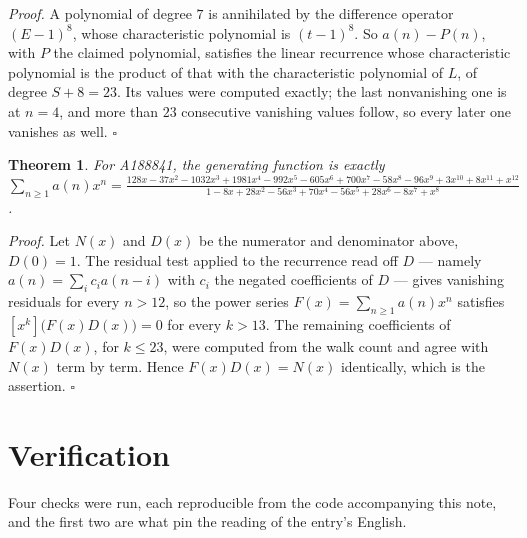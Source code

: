 \documentclass[11pt]{article}
\newtheorem{theorem}{Theorem}
\theoremstyle{definition}
\begin{document}
{\itshape Proof.} A polynomial of degree $7$ is annihilated by the difference operator $(E-1)^{8}$, whose characteristic polynomial is $(t-1)^{8}$. So $a(n) - P(n)$, with $P$ the claimed polynomial, satisfies the linear recurrence whose characteristic polynomial is the product of that with the characteristic polynomial of $L$, of degree $S + 8 = 23$. Its values were computed exactly; the last nonvanishing one is at $n = 4$, and more than $23$ consecutive vanishing values follow, so every later one vanishes as well. $\square$

\begin{theorem} For A188841, the generating function is exactly $\sum_{n\ge 1} a(n)x^n = \frac{128x - 37x^{2} - 1032x^{3} + 1981x^{4} - 992x^{5} - 605x^{6} + 700x^{7} - 58x^{8} - 96x^{9} + 3x^{10} + 8x^{11} + x^{12}}{1 - 8x + 28x^{2} - 56x^{3} + 70x^{4} - 56x^{5} + 28x^{6} - 8x^{7} + x^{8}}$.\end{theorem}

{\itshape Proof.} Let $N(x)$ and $D(x)$ be the numerator and denominator above, $D(0)=1$. The residual test applied to the recurrence read off $D$ --- namely $a(n) = \sum_i c_i a(n-i)$ with $c_i$ the negated coefficients of $D$ --- gives vanishing residuals for every $n > 12$, so the power series $F(x)=\sum_{n\ge 1}a(n)x^n$ satisfies $[x^k]\bigl(F(x)D(x)\bigr) = 0$ for every $k > 13$. The remaining coefficients of $F(x)D(x)$, for $k \le 23$, were computed from the walk count and agree with $N(x)$ term by term. Hence $F(x)D(x) = N(x)$ identically, which is the assertion. $\square$

\section{Verification}

Four checks were run, each reproducible from the code accompanying this note, and the first two are what pin the reading of the entry's English.
\end{document}
